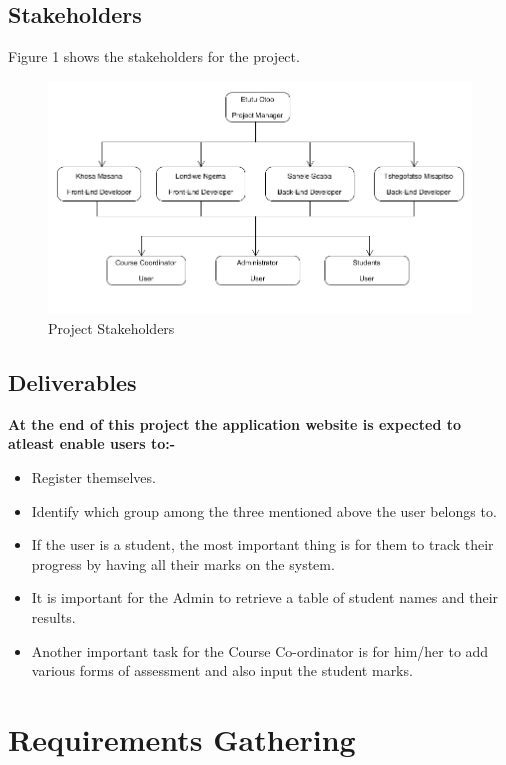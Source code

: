 \documentclass[10pt,onecolumn]{MainDocument}
\begin{document}
\subsection{Stakeholders}

Figure 1 shows the stakeholders for the project. 


\begin{figure}[h]
\begin{center}
\includegraphics[scale=0.70]{stakeholders}
\caption{Project Stakeholders}
\end{center}
\end{figure}

\subsection{Deliverables}

\textbf{At the end of this project the application website is expected to atleast enable users to:-}
\begin{itemize}
\item Register themselves.
\item Identify which group among the three mentioned above the user belongs to.
\item If the user is a student, the most important thing is for them to track their progress by having all their marks on the system.
\item It is important for the Admin to retrieve a table of student names and their results.
\item Another important task for the Course Co-ordinator is for him/her to add various forms of assessment and also input the student marks.
\end{itemize} 


\clearpage
\newpage
\section{Requirements Gathering}
\end{document}
